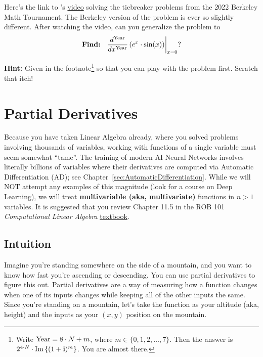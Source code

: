 Here's the link to \bprp's \href{https://youtu.be/xu5elUhRg4E?t=190}{video} solving the tiebreaker problems from the 2022 Berkeley Math Tournament. The Berkeley version of the problem is ever so slightly different. After watching the video, can you generalize the problem to 
$$\text{\bf Find:}~~ \left. \frac{d^{\rm Year}}{dx^{\rm Year}}\left( e^x \cdot \sin(x) \right) \right|_{x=0}?$$

\textbf{Hint:} Given in the footnote\footnote{Write ${\rm Year} = 8 \cdot N + m$, where $m \in \{0, 1, 2, \ldots, 7\}$. Then the answer is $2^{4 \cdot N} \cdot {\rm Im} \left\{ (1 +\mathop{\bm{\mathrm i}})^m \right\}$. You are almost there.} so that you can play with the problem first. Scratch that itch!

\section{Partial Derivatives}


Because you have taken Linear Algebra already, where you solved problems involving thousands of variables, working with functions of a single variable must seem somewhat ``tame''. The training of modern AI Neural Networks involves literally billions of variables where their derivatives are computed via Automatic Differentiation (AD); see Chapter~\ref{sec:AutomaticDifferentiation}. While we will NOT attempt any examples of this magnitude (look for a course on Deep Learning), we will treat \textbf{multivariable (aka, multivariate)} functions in \(n>1\) variables. It is suggested that you review Chapter 11.5 in the ROB 101 \textit{Computational Linear Algebra} \href{https://grizzle.robotics.umich.edu/education/rob101.html}{textbook}.

\subsection{Intuition}

Imagine you're standing somewhere on the side of a mountain, and you want to know how fast you're ascending or descending. You can use partial derivatives to figure this out. Partial derivatives are a way of measuring how a function changes when one of its inputs changes while keeping all of the other inputs the same. Since you're standing on a mountain, let's take the function as your altitude (aka, height) and the inputs as your \((x, y)\) position on the mountain.


